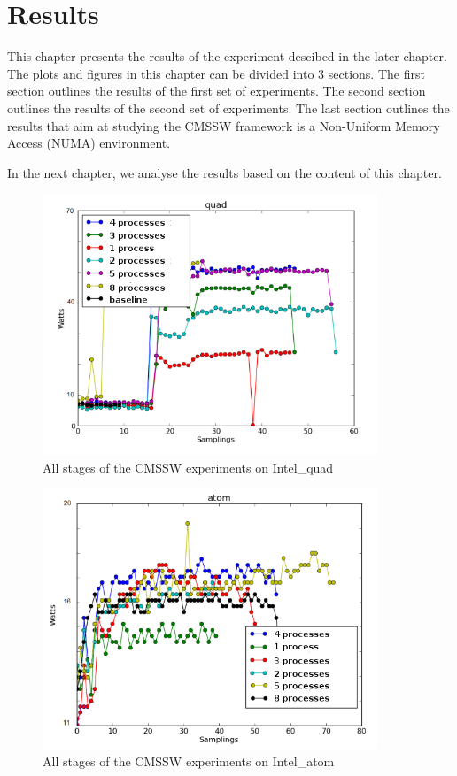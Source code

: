 \chapter{Results}

This chapter presents the results of the experiment descibed in the later chapter. The plots and figures in this chapter can be divided into 3 sections. The first section outlines the results of the first set of experiments. The second section outlines the results of the second set of experiments. The last section outlines the results that aim at studying the CMSSW framework is a Non-Uniform Memory Access (NUMA) environment.

In the next chapter, we analyse the results based on the content of this chapter.

\begin{figure}[h!]
  \centering
    \includegraphics[width=100mm]{"img/aalto/aalto_total_quad"}
    \caption{All stages of the CMSSW experiments on Intel\_quad}
    \label{fig:aalto_quad_clamp}
\end{figure}

\begin{figure}[h!]
  \centering
    \includegraphics[width=100mm]{"img/aalto/aalto_total_atom"}
    \caption{All stages of the CMSSW experiments on Intel\_atom}
    \label{fig:aalto_atom_clamp}
\end{figure}

